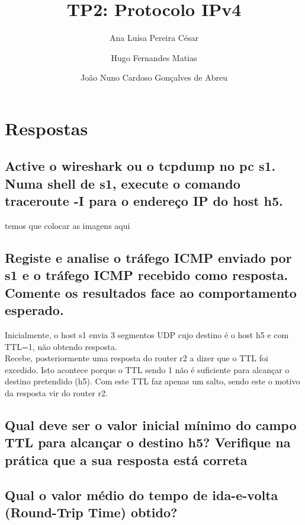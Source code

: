 \documentclass{llncs}
\begin{document}
\mainmatter
\title{TP2: Protocolo IPv4}


\author{Ana Luísa Pereira César\and Hugo Fernandes Matias \and João Nuno Cardoso Gonçalves de Abreu }




\date{}


\maketitle

\section{Respostas}

\subsection{Active o wireshark ou o tcpdump no pc s1. Numa shell de s1, execute o comando traceroute -I para o endereço IP  do  host h5.    }
temos que colocar as imagens aqui
\subsection{Registe e analise o tráfego ICMP enviado por s1 e o tráfego ICMP recebido como resposta. Comente os resultados face ao  comportamento esperado.}

Inicialmente, o host s1 envia 3 segmentos UDP cujo destino é o host h5 e com TTL=1, não obtendo resposta. \\
Recebe, posteriormente uma resposta do router r2 a dizer que o TTL foi excedido. Isto acontece porque o TTL sendo 1 não é suficiente para alcançar o destino pretendido (h5). Com este TTL faz apenas um salto, sendo este o motivo da resposta vir do router r2.


\subsection{Qual deve ser o valor inicial mínimo do campo TTL para alcançar o destino   h5? Verifique na prática que a sua resposta está correta}



\subsection{Qual o valor médio do tempo de ida-e-volta (Round-Trip Time) obtido?}
\end{document}
